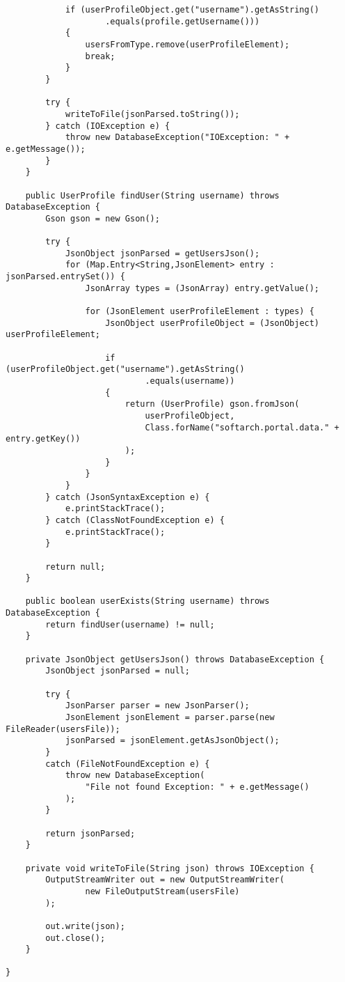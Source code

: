 \begin{lstlisting}
            if (userProfileObject.get("username").getAsString()
                    .equals(profile.getUsername()))
            {
                usersFromType.remove(userProfileElement);
                break;
            }
        }
        
        try {
            writeToFile(jsonParsed.toString());
        } catch (IOException e) {
            throw new DatabaseException("IOException: " + e.getMessage());
        }
    }

    public UserProfile findUser(String username) throws DatabaseException {
        Gson gson = new Gson();
        
        try {
            JsonObject jsonParsed = getUsersJson();
            for (Map.Entry<String,JsonElement> entry : jsonParsed.entrySet()) {
                JsonArray types = (JsonArray) entry.getValue();
                
                for (JsonElement userProfileElement : types) {
                    JsonObject userProfileObject = (JsonObject) userProfileElement;
                    
                    if (userProfileObject.get("username").getAsString()
                            .equals(username))
                    {
                        return (UserProfile) gson.fromJson(
                            userProfileObject,
                            Class.forName("softarch.portal.data." + entry.getKey())
                        );
                    }
                }
            }
        } catch (JsonSyntaxException e) {
            e.printStackTrace();
        } catch (ClassNotFoundException e) {
            e.printStackTrace();
        }
        
        return null;
    }

    public boolean userExists(String username) throws DatabaseException {
        return findUser(username) != null;
    }
    
    private JsonObject getUsersJson() throws DatabaseException {
        JsonObject jsonParsed = null;
        
        try {
            JsonParser parser = new JsonParser();
            JsonElement jsonElement = parser.parse(new FileReader(usersFile));
            jsonParsed = jsonElement.getAsJsonObject();
        }
        catch (FileNotFoundException e) {
            throw new DatabaseException(
                "File not found Exception: " + e.getMessage()
            );
        }
        
        return jsonParsed;
    }
    
    private void writeToFile(String json) throws IOException {
        OutputStreamWriter out = new OutputStreamWriter(
                new FileOutputStream(usersFile)
        );
        
        out.write(json);
        out.close();
    }

}
\end{lstlisting}

